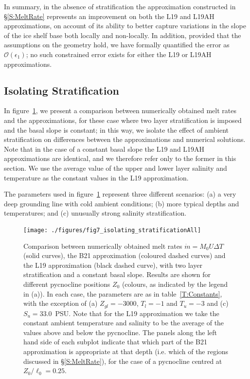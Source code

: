 \documentclass[openacc]{rsproca_new}%
\newcommand{\order}[1]{\mathcal{O}(#1)}
\newcommand{\epsone}{\epsilon_{1}} %
\begin{document}
In summary, in the absence of stratification the approximation constructed in \S\ref{S:MeltRate} represents an improvement on both the L19 and L19AH approximations, on account of its ability to better capture variations in the slope of the ice shelf base both locally and non-locally. In addition, provided that the assumptions on the geometry hold, we have formally quantified the error as $\order{\epsone}$; no such constrained error exists for either the L19 or L19AH approximations. 

\subsection{Isolating Stratification}
In figure~\ref{fig:Numerics:PycnoclinePosition}, we present a comparison between numerically obtained melt rates and the approximations, for these case where two layer stratification is imposed and the basal slope is constant; in this way, we isolate the effect of ambient stratification on differences between the approximations and numerical solutions. Note that in the case of a constant basal slope the L19 and L19AH approximations are identical, and we therefore refer only to the former in this section. We use the average value of the upper and lower layer salinity and temperature as the constant values in the L19 approximation.

The parameters used in figure~\ref{fig:Numerics:PycnoclinePosition} represent three different scenarios: (a) a very deep grounding line with cold ambient conditions; (b) more typical depths and temperatures; and (c) unusually strong salinity stratification.

\begin{figure}
\centering
\texttt{[image: ./figures/fig7\_isolating\_stratificationAll]}
\caption{Comparison between numerically obtained melt rates $\dot{m}= M_0 U \Delta T$ (solid curves), the B21 approximation (coloured dashed curves) and the L19 approximation (black dashed curve), with two layer stratification and a constant basal slope. Results are shown for different pycnocline positions $Z_0$ (colours, as indicated by the legend in (a)). In each case, the parameters are as in table~\ref{T:Constants}, with the exception of (a) $Z_{gl} = -3000$, $T_l = -1$ and $T_u = -3$ and (c)  $S_u = 33.0$~PSU. Note that for the L19 approximation we take the constant ambient temperature and salinity to be the average of the values above and below the pycnocline. The panels along the left hand side of each subplot indicate that which part of the B21 approximation is appropriate at that depth (i.e. which of the regions discussed in \S\ref{S:MeltRate}), for the case of a pycnocline centred at $Z_0/\ell_0 = 0.25$.}\label{fig:Numerics:PycnoclinePosition}
\end{figure}
\end{document}
